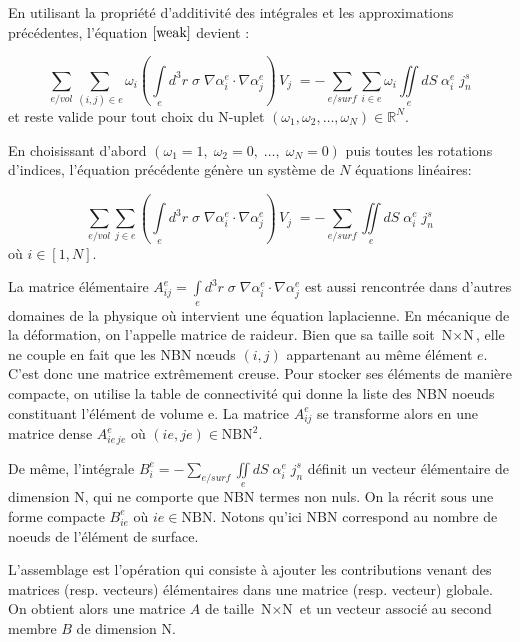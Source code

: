 \documentclass[a4paper, 11pt]{article}
\begin{document}
En utilisant la propriété d'additivité des intégrales et les approximations précédentes,  l'équation $\eqref{weak}$ devient :

\begin{equation}
\sum\limits_{e / {vol}}{} \sum\limits_{(i,j) \in e}  \omega_i \left( {\int\limits_e {{d^3}r\;\sigma \;\nabla {\alpha_i^e} \cdot \nabla {\alpha _j^e}} } \right)\,{V_j}\; =  - \sum\limits_{e / {surf}}{}  \sum\limits_{i \in e}  \omega_i  \iint\limits_{e} 
 {dS\;} {\alpha _i^e}\;j_n^s
\label{dsc_weak1}
\end{equation}
et reste valide pour tout choix du N-uplet $(\omega_1, \omega_2, \ldots, \omega_N) \in \mathbb{R}^N$.

En choisissant d'abord  $(\omega_1=1,\; \omega_2=0, \; \ldots, \; \omega_N=0)$ puis toutes les rotations d'indices, 
l'équation précédente génère un système de $N$ équations linéaires:

\begin{equation}
\sum\limits_{e / {vol}}{} \sum\limits_{j\in e}  \left( {\int\limits_e {{d^3}r\;\sigma \;\nabla {\alpha_i^e} \cdot \nabla {\alpha _j^e}} } \right)\,{V_j}\; =  - \sum\limits_{e / {surf}}{} \iint\limits_{e} 
 {dS\;} {\alpha _i^e}\;j_n^s
\label{dsc_weak}
\end{equation}
où $i \in [1, N]$.

La matrice élémentaire $A_{ij}^e = \int\limits_e {{d^3}r\;\sigma \;\nabla \alpha _i^e \cdot \nabla \alpha _j^e} $ est  aussi rencontrée dans d'autres domaines de la physique où intervient une équation laplacienne. En mécanique de la déformation, on l'appelle matrice de raideur.
Bien que sa taille soit $\text{N} \times \text{N}$, elle ne couple en fait que les NBN nœuds  $\left( {i,j} \right)$ appartenant au même élément $e$. C'est donc une matrice extrêmement creuse.
 Pour stocker ses éléments de manière compacte, on utilise la
table de connectivité qui donne la liste des NBN noeuds constituant l'élément de volume e. 
La matrice $A_{ij}^e$ se transforme alors en une matrice dense $A_{ie\, je}^e$ où  $\left( {ie,je} \right) \in \text{NBN}^2$.

De même, l’intégrale  $B_i^e =  - \sum\limits_{e/surf}^{}  \iint\limits_e {dS\;} \alpha _i^e\;j_n^s$ définit un vecteur élémentaire de dimension N, qui ne comporte que NBN termes non nuls. On la récrit
sous une forme compacte $B_{ie}^e$ où $ie \in \text{NBN}$. Notons qu'ici NBN correspond au nombre de noeuds de l'élément de surface.

L'assemblage est l'opération qui consiste à ajouter les contributions venant des matrices (resp. vecteurs) élémentaires dans une matrice (resp. vecteur) globale. On obtient alors une matrice $A$ de taille 
$\text{N} \times \text{N}$ et un vecteur associé au second membre $B$ de dimension N.
\end{document}
